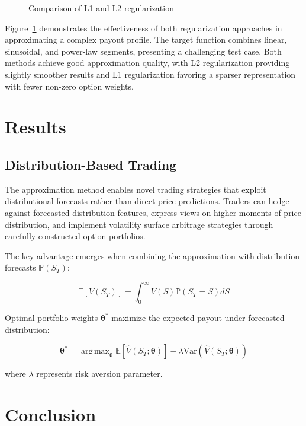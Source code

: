 \documentclass[12pt]{article}
\DeclareMathOperator*{\argmax}{arg\,max}
\begin{document}
\begin{figure}[htbp]
\centering

\caption{Comparison of L1 and L2 regularization}
\label{fig:regularization}
\end{figure}

Figure~\ref{fig:regularization} demonstrates the effectiveness of both regularization approaches in approximating a complex payout profile. The target function combines linear, sinusoidal, and power-law segments, presenting a challenging test case. Both methods achieve good approximation quality, with L2 regularization providing slightly smoother results and L1 regularization favoring a sparser representation with fewer non-zero option weights.

\section{Results}
\subsection{Distribution-Based Trading}
The approximation method enables novel trading strategies that exploit distributional forecasts rather than direct price predictions. Traders can hedge against forecasted distribution features, express views on higher moments of price distribution, and implement volatility surface arbitrage strategies through carefully constructed option portfolios.

The key advantage emerges when combining the approximation with distribution forecasts $\mathbb{P}(S_T)$:
 
\begin{equation}
\mathbb{E}[V(S_T)] = \int_{0}^{\infty} V(S) \mathbb{P}(S_T = S) dS
\end{equation}

Optimal portfolio weights $\boldsymbol{\theta}^*$ maximize the expected payout under forecasted distribution:

\begin{equation}
\boldsymbol{\theta}^* = \argmax_{\boldsymbol{\theta}} \mathbb{E}\left[\hat{V}(S_T;\boldsymbol{\theta})\right] - \lambda \text{Var}\left(\hat{V}(S_T;\boldsymbol{\theta})\right)
\end{equation}

where $\lambda$ represents risk aversion parameter.

\section{Conclusion}



\end{document}

